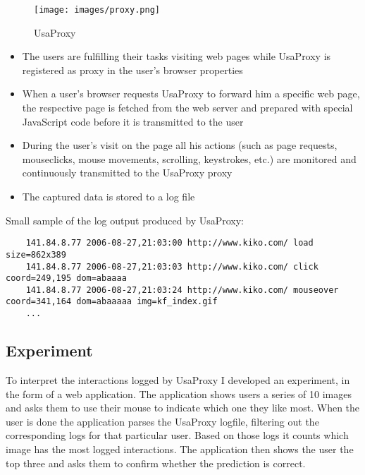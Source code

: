 \begin{figure}[h] 
	\centering
	\texttt{[image: images/proxy.png]}
	\caption{UsaProxy}
\end{figure}
	
\begin{itemize}	
	\item The users are fulfilling their tasks visiting web pages while UsaProxy is registered as proxy in the user’s browser properties
	\item When a user’s browser requests UsaProxy to forward him a specific web page, the respective page is fetched from the web server and prepared with special JavaScript code before it is transmitted to the user
	\item During the user’s visit on the page all his actions (such as page requests, mouseclicks, mouse movements, scrolling, keystrokes, etc.) are monitored and continuously transmitted to the UsaProxy proxy
	\item The captured data is stored to a log file
\end{itemize}
	
Small sample of the log output produced by UsaProxy:

\begin{lstlisting}
	141.84.8.77 2006-08-27,21:03:00 http://www.kiko.com/ load size=862x389
	141.84.8.77 2006-08-27,21:03:03 http://www.kiko.com/ click coord=249,195 dom=abaaaa
	141.84.8.77 2006-08-27,21:03:24 http://www.kiko.com/ mouseover coord=341,164 dom=abaaaaa img=kf_index.gif
	...
\end{lstlisting}
	
\subsection{Experiment}
To interpret the interactions logged by UsaProxy I developed an experiment, in the form of a web application. The application shows users a series of 10 images and asks them to use their mouse to indicate which one they like most. When the user is done the application parses the UsaProxy logfile, filtering out the corresponding logs for that particular user. Based on those logs it counts which image has the most logged interactions. The application then shows the user the top three and asks them to confirm whether the prediction is correct.